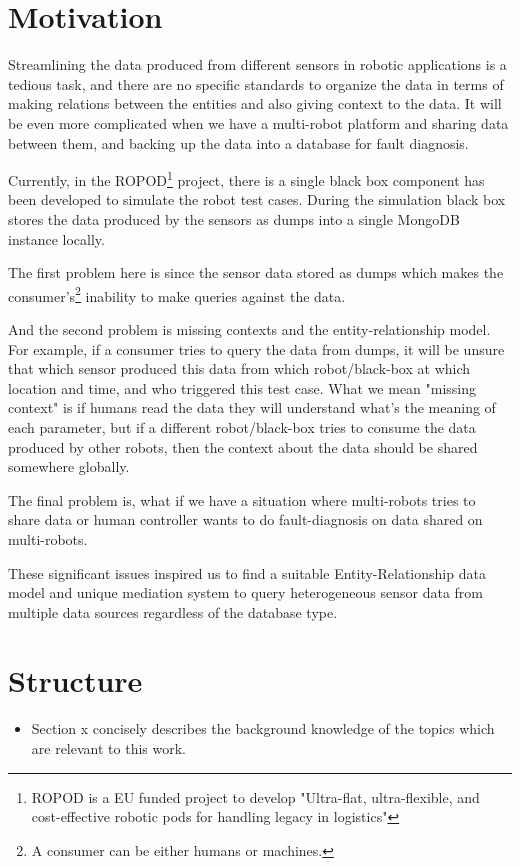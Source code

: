     \section{Motivation}
    
Streamlining the data produced from different sensors in robotic applications is a tedious task, and there are no specific standards to organize the data in terms of making relations between the entities and also giving context to the data. It will be even more complicated when we have a multi-robot platform and sharing data between them, and backing up the data into a database for fault diagnosis.

Currently, in the ROPOD\footnote{ROPOD is a EU funded project to develop "Ultra-flat, ultra-flexible, and cost-effective robotic pods for handling legacy in logistics"} project, there is a single black box component has been developed to simulate the robot test cases. During the simulation black box stores the data produced by the sensors as dumps into a single MongoDB instance locally.  

The first problem here is since the sensor data stored as dumps which makes the consumer's\footnote{A consumer can be either humans or machines.} inability to make queries against the data. 

And the second problem is missing contexts and the entity-relationship model. For example, if a consumer tries to query the data from dumps, it will be unsure that which sensor produced this data from which robot/black-box at which location and time, and who triggered this test case. What we mean "missing context" is if humans read the data they will understand what's the meaning of each parameter, but if a different robot/black-box tries to consume the data produced by other robots, then the context about the data should be shared somewhere globally.

The final problem is, what if we have a situation where multi-robots tries to share data or human controller wants to do fault-diagnosis on data shared on multi-robots. 


These significant issues inspired us to find a suitable Entity-Relationship data model and unique mediation system to query heterogeneous sensor data from multiple data sources regardless of the database type.


    \section{Structure}
	
		\begin{itemize}
			\item Section x concisely describes the background knowledge of the topics which are relevant to this work.
		\end{itemize}

\let\cleardoublepage\clearpage

